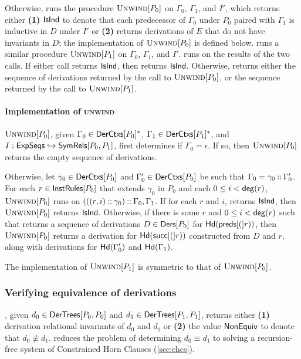 Otherwise, \chkindaux runs the procedure $\textsc{Unwind}[ P_0 ]$ on $\Gamma_0$,
$\Gamma_1$, and $I'$, which returns either \textbf{(1)} $\mathsf{IsInd}$ to
denote that each predecessor of $\Gamma_0$ under $P_0$
%
%
paired with $\Gamma_1$ is inductive in $D$ under $I'$ or %
\textbf{(2)} returns derivations of $E$ that do not have invariants in
$D$;
%
the implementation of $\textsc{Unwind}[ P_0 ]$ is defined below.
%
\chkindaux runs a similar procedure $\textsc{Unwind}[ P_1 ]$ on $\Gamma_0$,
$\Gamma_1$, and $I'$.
\chkindaux runs \chooseres on the results of the two calls.
%
If either call returns $\mathsf{IsInd}$, then \chooseres returns $\mathsf{IsInd}$.
%
Otherwise, \chooseres returns either the sequence of derivations
returned by the call to $\textsc{Unwind}[ P_0 ]$, or the sequence returned by
the call to $\textsc{Unwind}[ P_1 ]$.

\paragraph{Implementation of \textsc{unwind}}
%
$\textsc{Unwind}[ P_0 ]$, given $\Gamma_0 \in \mathsf{DerCtxs}[ P_0 ]^{*}$, $\Gamma_1 \in
\mathsf{DerCtxs}[ P_1 ]^{*}$, and $I : \mathsf{ExpSeqs} \hookrightarrow \mathsf{SymRels}[ P_0, P_1 ]$,
first determines if $\Gamma_0 = \epsilon$.
%
If so, then $\textsc{Unwind}[ P_0 ]$ returns the empty sequence of derivations.

Otherwise, let $\gamma_0 \in \mathsf{DerCtxs}[ P_0 ]$ and $\Gamma_0' \in
\mathsf{DerCtxs}[ P_0 ]$ be such that $\Gamma_0 = \gamma_0 \mathbin{::} \Gamma_0'$.
%
For each $r \in \mathsf{InstRules}[ P_0 ]$ that extends $\gamma_0$ in $P_0$ and
each $0 \leq i < \mathsf{deg}(r)$, $\textsc{Unwind}[ P_0 ]$ runs \chkindaux on
$(((r, i) \mathbin{::} \gamma_0) \mathbin{::} \Gamma_0, \Gamma_1$.
%
If for each $r$ and $i$, \chkindaux returns $\mathsf{IsInd}$, then
$\textsc{Unwind}[ P_0 ]$ returns $\mathsf{IsInd}$.
%
Otherwise, if there is some $r$ and $0 \leq i < \mathsf{deg}(r)$ such
that \chkindaux returns a sequence of derivations $D \in \mathsf{Ders}[ P_0 ]$
for $\mathsf{Hd}(\mathsf{preds}[ ( ]r))$, then $\textsc{Unwind}[ P_0 ]$ returns a
derivation for $\mathsf{Hd}(\mathsf{succ}[ ( ]r))$ constructed from $D$ and $r$,
along with derivations for $\mathsf{Hd}(\Gamma_0')$ and
$\mathsf{Hd}(\Gamma_1)$.

The implementation of $\textsc{Unwind}[ P_1 ]$ is symmetric to that of
$\textsc{Unwind}[ P_0 ]$.

\subsubsection{Verifying equivalence of derivations}
\label{sec:verify-ders}
%
\verifyders, given $d_0 \in \mathsf{DerTrees}[  P_0 ,  P_0  ]$ and %
$d_1 \in \mathsf{DerTrees}[ P_1, P_1 ]$, returns either \textbf{(1)} derivation
relational invariants of $d_0$ and $d_1$ or %
\textbf{(2)} the value $\mathsf{NonEquiv}$ to denote that $d_0 \not\equiv
d_1$.
%
\verifyders reduces the problem of determining $d_0 \equiv d_1$ to
solving a recursion-free system of Constrained Horn Clauses
(\autoref{sec:chcs}).

